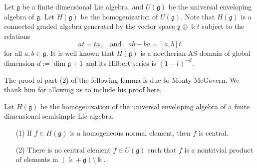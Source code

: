 Let ${\mathfrak g}$ be a finite dimensional Lie algebra, 
and $U({\mathfrak g})$ be the universal enveloping algebra
of ${\mathfrak g}$. Let $H({\mathfrak g})$ be the homogenization
of $U({\mathfrak g})$. Note that $H({\mathfrak g})$
is a connected graded algebra generated by the vector space 
${\mathfrak g}\oplus  \Bbbk  t$ subject to the relations
$$at = ta, \quad {\text{and}} \quad ab-ba=[a,b]t$$
for all $a,b\in {\mathfrak g}$. 
It is well known that $H({\mathfrak g})$ is a noetherian 
AS domain of global dimension $d:=\dim {\mathfrak g}+1$ and
its Hilbert series is $(1-t)^{-d}$. 

The proof of part (2) of the following lemma is due to Monty 
McGovern. We thank him for allowing us to include his proof 
here. 

\begin{lemma}
\label{xxlem5.2} 
Let $H({\mathfrak g})$ be the homogenization of the universal
enveloping algebra of a finite dimensional semisimple Lie algebra.
\begin{enumerate}
\item[(1)]
If $f\in H({\mathfrak g})$ is a homogeneous normal element, then $f$ is central.
\item[(2)]
There is no central element $f\in U({\mathfrak g})$ such that $f$ 
is a nontrivial product of elements in $(\Bbbk+{\mathfrak g})\setminus \Bbbk$.
\end{enumerate}
\end{lemma}

